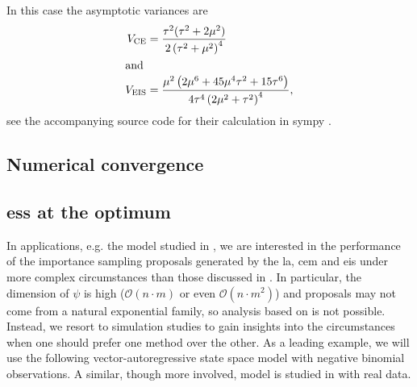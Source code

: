 \begin{example}
    In this case the asymptotic variances are
    \begin{align*}
        V_{{\text{CE}}} &= \frac{\tau^{2}(\tau^{2} + 2\mu^{2})}{2 \left( \tau^{2} + \mu^{2} \right)^{4}}\\
        \intertext{and}
        V_{{\text{EIS}}} &= \frac{\mu^{2} \left(2 \mu^{6} + 45 \mu^{4} \tau^{2} + 15 \tau^{6}\right)}{4 \tau^{4} \left(2 \mu^{2} + \tau^{2}\right)^{4}},
    \end{align*}
    see the accompanying source code for their calculation in sympy .
\end{example}

\subsection{Numerical convergence}

\subsection{\texorpdfstring{\gls{ess} at the optimum}{ESS at the optimum}}


In applications, e.g. the model studied in , we are interested in the performance of the importance sampling proposals generated by the \gls{la}, \gls{cem} and \gls{eis} under more complex circumstances than those discussed in . In particular, the dimension of $\psi$ is high ($\mathcal O(n \cdot m)$ or even $\mathcal O(n \cdot m^{2})$) and proposals may not come from a natural exponential family, so analysis based on  is not possible. Instead, we resort to simulation studies to gain insights into the circumstances when one should prefer one method over the other.
As a leading example, we will use the following vector-autoregressive state space model with negative binomial observations. A similar, though more involved, model is studied in  with real data.

